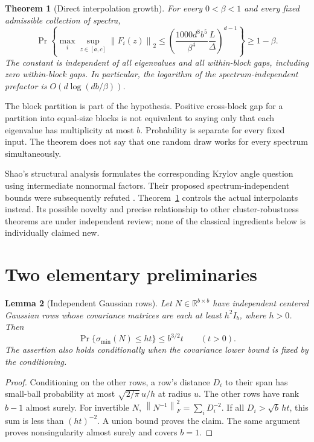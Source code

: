 \documentclass[11pt]{article}
\newtheorem{theorem}{Theorem}
\newtheorem{lemma}[theorem]{Lemma}
\newcommand{\R}{\mathbb R}
\newcommand{\norm}[1]{\left\lVert#1\right\rVert}
\begin{document}
\begin{theorem}[Direct interpolation growth]\label{thm:main}
For every $0<\beta<1$ and every fixed admissible collection of spectra,
\[
 \Pr\left\{\max_i\sup_{z\in[a,c]}\norm{F_i(z)}_2
 \leq\left(\frac{1000d^8b^5}{\beta^4}\frac L\Delta\right)^{d-1}
 \right\}\geq1-\beta.
\]
The constant is independent of all eigenvalues and all within-block gaps,
including zero within-block gaps. In particular, the logarithm of the
spectrum-independent prefactor is $O(d\log(db/\beta))$.
\end{theorem}

The block partition is part of the hypothesis. Positive cross-block gap
for a partition into equal-size blocks is not equivalent to saying only
that each eigenvalue has multiplicity at most $b$.
Probability is separate for every fixed input. The theorem does not say
that one random draw works for every spectrum simultaneously.

Shao's structural analysis \cite{shao} formulates the corresponding Krylov
angle question using intermediate nonnormal factors. Their proposed
spectrum-independent bounds were subsequently refuted \cite{stepaniants}.
Theorem~\ref{thm:main} controls the actual interpolants instead. Its
possible novelty and precise relationship to other cluster-robustness
theorems are under independent review; none of the classical ingredients
below is individually claimed new.

\section{Two elementary preliminaries}
\begin{lemma}[Independent Gaussian rows]\label{lem:rows}
Let $N\in\R^{b\times b}$ have independent centered Gaussian rows whose
covariance matrices are each at least $h^2I_b$, where $h>0$. Then
\[
 \Pr\{\sigma_{\min}(N)\leq ht\}\leq b^{3/2}t\qquad(t>0).
\]
The assertion also holds conditionally when the covariance lower bound is
fixed by the conditioning.
\end{lemma}
\begin{proof}
Conditioning on the other rows, a row's distance $D_i$ to their span has
small-ball probability at most $\sqrt{2/\pi}\,u/h$ at radius $u$.
The other rows have rank $b-1$ almost surely. For invertible $N$,
$\norm{N^{-1}}_F^2=\sum_iD_i^{-2}$. If all $D_i>\sqrt b\,ht$, this
sum is less than $(ht)^{-2}$. A union bound proves the claim. The same
argument proves nonsingularity almost surely and covers $b=1$.
\end{proof}
\end{document}
